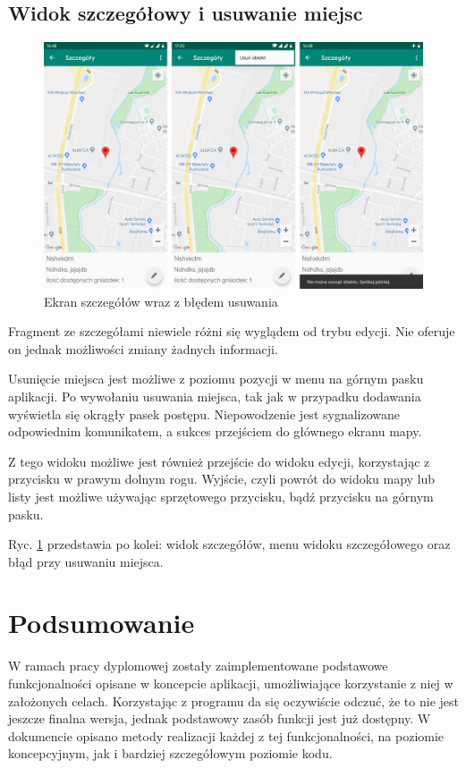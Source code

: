 \documentclass[polish,polish,a4paper,12pt]{article}
\let\sectioncmd\section
\renewcommand{\section}{\clearpage\sectioncmd}
\begin{document}
	\subsection{Widok szczegółowy i usuwanie miejsc}

	\begin{figure}[H]
		\centering
		\includegraphics[width = \textwidth]{screenshot-detail}
		\caption{Ekran szczegółów wraz z błędem usuwania}
		\label{fig:screenshotdetail}
	\end{figure}

	Fragment ze szczegółami niewiele różni się wyglądem od trybu edycji. Nie oferuje on jednak możliwości zmiany żadnych informacji.

	Usunięcie miejsca jest możliwe z poziomu pozycji w menu na górnym pasku aplikacji. Po wywołaniu usuwania miejsca, tak jak w przypadku dodawania wyświetla się okrągły pasek postępu. Niepowodzenie jest sygnalizowane odpowiednim komunikatem, a sukces przejściem do głównego ekranu mapy.

	Z tego widoku możliwe jest również przejście do widoku edycji, korzystając z przycisku w prawym dolnym rogu. Wyjście, czyli powrót do widoku mapy lub listy jest możliwe używając sprzętowego przycisku, bądź przycisku na górnym pasku.

	Ryc. \ref{fig:screenshotdetail} przedstawia po kolei: widok szczegółów, menu widoku szczegółowego oraz błąd przy usuwaniu miejsca.

\section{Podsumowanie}\label{summary}

W ramach pracy dyplomowej zostały zaimplementowane podstawowe funkcjonalności opisane w koncepcie aplikacji, umożliwiające korzystanie z niej w założonych celach. Korzystając z programu da się oczywiście odczuć, że to nie jest jeszcze finalna wersja, jednak podstawowy zasób funkcji jest już dostępny. W dokumencie opisano metody realizacji każdej z tej funkcjonalności, na poziomie koncepcyjnym, jak i bardziej szczegółowym poziomie kodu.
\end{document}
